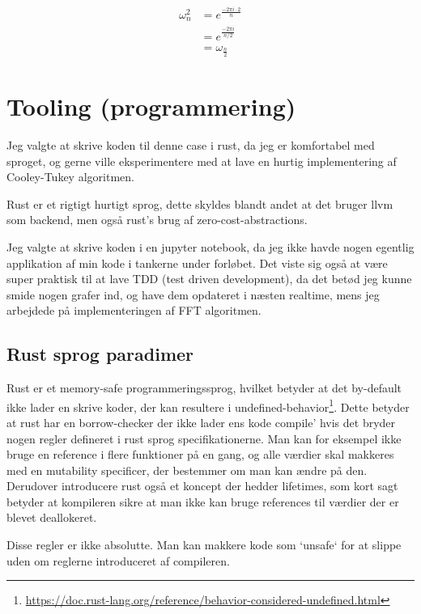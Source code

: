 \documentclass[11pt,a4paper]{article}
\begin{document}
\begin{equation}
\begin{split}
\omega_n^2 &= e^{\frac{-2\pi i \cdot 2}{n}} \\
&= e^{\frac{-2\pi i}{n/2}} \\
&= \omega_{\frac{n}{2}}
\end{split}
\end{equation}

\section{Tooling (programmering)}
\label{sec:org4242771}
Jeg valgte at skrive koden til denne case i rust, da jeg er komfortabel med sproget,
og gerne ville eksperimentere med at lave en hurtig implementering af Cooley-Tukey algoritmen.

Rust er et rigtigt hurtigt sprog, dette skyldes blandt andet at det bruger llvm som backend,
men også rust's brug af zero-cost-abstractions.

Jeg valgte at skrive koden i en jupyter notebook, da jeg ikke havde nogen egentlig
applikation af min kode i tankerne under forløbet.
Det viste sig også at være super praktisk til at lave TDD (test driven development),
da det betød jeg kunne smide nogen grafer ind, og have dem opdateret i næsten realtime,
mens jeg arbejdede på implementeringen af FFT algoritmen.

\subsection{Rust sprog paradimer}
\label{sec:org030215c}
Rust er et memory-safe programmeringssprog,
hvilket betyder at det by-default ikke lader en skrive koder, der kan resultere i undefined-behavior\footnote{\url{https://doc.rust-lang.org/reference/behavior-considered-undefined.html}}.
Dette betyder at rust har en borrow-checker der ikke lader ens kode compile' hvis det bryder nogen regler defineret i rust sprog specifikationerne.
Man kan for eksempel ikke bruge en reference i flere funktioner på en gang, og alle værdier skal makkeres med
en mutability specificer, der bestemmer om man kan ændre på den. Derudover introducere rust også et koncept der hedder lifetimes,
som kort sagt betyder at kompileren sikre at man ikke kan bruge references til værdier der er blevet deallokeret.

\bigskip

Disse regler er ikke absolutte. Man kan makkere kode som `unsafe` for at slippe uden om reglerne introduceret af compileren.
\end{document}
